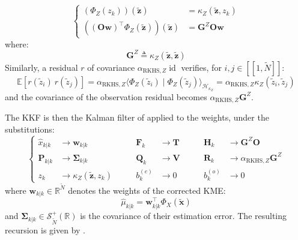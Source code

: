 \begin{itemize}
	\begin{equation}
		\left\{\begin{aligned}
		\left(\Phi_Z(z_k)\right)(\tilde{\mathbf{z}})&=\kappa_Z(\tilde{\mathbf{z}},z_k)\\
		\left((\mathbf{O}\mathbf{w})^\top\Phi_Z(\tilde{\mathbf{z}})\right)(\tilde{\mathbf{z}})&=\mathbf{G}^Z\mathbf{O}\mathbf{w}
		\end{aligned}\right.
	\end{equation}
	where:
	\begin{equation}
		\mathbf{G}^Z\triangleq \kappa_Z(\tilde{\mathbf{z}},\tilde{\mathbf{z}})
	\end{equation}
	Similarly, a residual $r$ of covariance $\alpha_{\mathrm{RKHS},Z}\operatorname{id}$ verifies, for $i,j\in[\![1,\tilde{N}]\!]$:
	\begin{equation}
		\mathbb{E}\left[r(\tilde{z}_i)\:r(\tilde{z}_j)\right]=\alpha_{\mathrm{RKHS},Z}\langle\Phi_Z(\tilde{z}_i)\mid\Phi_Z(\tilde{z}_j)\rangle_{\mathcal{H}_{\kappa_Z}}=\alpha_{\mathrm{RKHS},Z}\kappa_Z(\tilde{z}_i,\tilde{z}_j)
	\end{equation}
	and the covariance of the observation residual becomes $\alpha_{\mathrm{RKHS},Z}\mathbf{G}^Z$.
\end{itemize}

The KKF is then the Kalman filter of  applied to the weights, under the substitutions:
\begin{equation}
	\left\{\begin{aligned}
	\hat{x}_{k|k}&\longrightarrow\mathbf{w}_{k|k}&\qquad \mathbf{F}_k&\longrightarrow \mathbf{T}&\qquad \mathbf{H}_k&\longrightarrow \mathbf{G}^Z\mathbf{O}\\
	\mathbf{P}_{k|k}&\longrightarrow\boldsymbol{\Sigma}_{k|k}&\qquad \mathbf{Q}_k&\longrightarrow \mathbf{V}&\qquad \mathbf{R}_k&\longrightarrow\alpha_{\mathrm{RKHS},Z}\mathbf{G}^Z\\
	z_k&\longrightarrow \kappa_Z(\tilde{\mathbf{z}},z_k)&\qquad b_k^{(e)}&\longrightarrow0&\qquad b_k^{(o)}&\longrightarrow0
	\end{aligned}\right.\label{eq:KKF_substitutions}
\end{equation}
where $\mathbf{w}_{k|k}\in\mathbb{R}^{\tilde{N}}$ denotes the weights of the corrected KME:
\begin{equation}
	\hat{\mu}_{k|k}=\mathbf{w}_{k|k}^\top\Phi_X(\tilde{\mathbf{x}})
\end{equation}
and $\boldsymbol{\Sigma}_{k|k}\in\mathcal{S}_{\tilde{N}}^+(\mathbb{R})$ is the covariance of their estimation error. The resulting recursion is given by .

